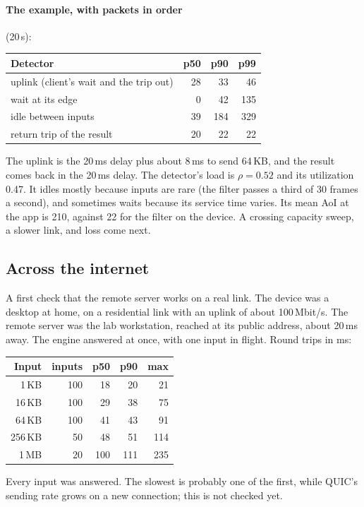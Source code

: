 \documentclass[11pt]{article}
\begin{document}
\paragraph{The example, with packets in order} (20\,s):
\begin{center}
\small
\begin{tabular}{@{}lrrr@{}}
\toprule
Detector & p50 & p90 & p99 \\
\midrule
uplink (client's wait and the trip out) & 28 & 33 & 46 \\
wait at its edge                        & 0  & 42 & 135 \\
idle between inputs                     & 39 & 184 & 329 \\
return trip of the result               & 20 & 22 & 22 \\
\bottomrule
\end{tabular}
\end{center}
The uplink is the 20\,ms delay plus about 8\,ms to send 64\,KB, and the
result comes back in the 20\,ms delay. The detector's load is $\rho = 0.52$
and its utilization 0.47. It idles mostly because inputs are rare (the filter
passes a third of 30 frames a second), and sometimes waits because its
service time varies. Its mean AoI at the app is 210, against 22 for the
filter on the device. A crossing capacity sweep, a slower link, and loss come
next.

\subsection{Across the internet}

A first check that the remote server works on a real link. The device was a
desktop at home, on a residential link with an uplink of about 100\,Mbit/s.
The remote server was the lab workstation, reached at its public address,
about 20\,ms away. The engine answered at once, with one input in flight.
Round trips in ms:
\begin{center}
\small
\begin{tabular}{@{}rrrrr@{}}
\toprule
Input & inputs & p50 & p90 & max \\
\midrule
1\,KB   & 100 & 18  & 20  & 21 \\
16\,KB  & 100 & 29  & 38  & 75 \\
64\,KB  & 100 & 41  & 43  & 91 \\
256\,KB & 50  & 48  & 51  & 114 \\
1\,MB   & 20  & 100 & 111 & 235 \\
\bottomrule
\end{tabular}
\end{center}
Every input was answered. The slowest is probably one of the first, while
QUIC's sending rate grows on a new connection; this is not checked yet.
\end{document}
